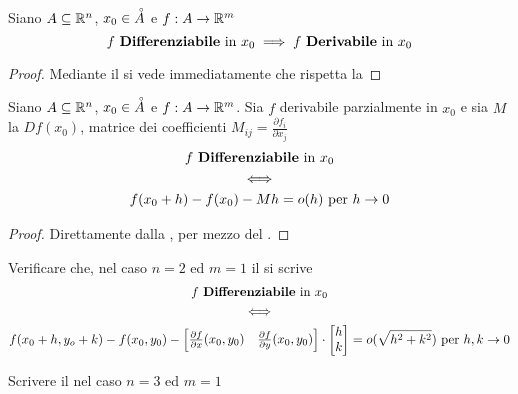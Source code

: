 \begin{corollary}
	Siano $A \subseteq \mathbb{R}^n$, $x_0 \in \accentset{\circ}{A}$ e $f:A \to \mathbb{R}^m$
	\[f \text{ \textbf{Differenziabile} in } x_0 \implies f \text{ \textbf{Derivabile} in } x_0\]
	\begin{proof}
		Mediante il  si vede immediatamente che rispetta la 
	\end{proof}
\end{corollary}
\begin{corollary}
	\label{coro:f_diff_con_matr_comp}
	Siano $A \subseteq \mathbb{R}^n$, $x_0 \in \accentset{\circ}{A}$ e $f:A \to \mathbb{R}^m$. Sia $f$ derivabile parzialmente in $x_0$ e sia $M$ la $Df(x_0)$, matrice dei coefficienti $M_{ij} = \frac{\partial f_i}{\partial x_j}$
	\begin{equation*}
		\begin{gathered}
			f \text{ \textbf{Differenziabile} in } x_0\\
			\iff\\
			f(x_0 + h) - f(x_0) - Mh = o(h) \text{ per } h \to 0
		\end{gathered}
	\end{equation*}
	\begin{proof}
		Direttamente dalla , per mezzo del .
	\end{proof}
\end{corollary}
\begin{exercise}
	Verificare che, nel caso $n = 2$ ed $m = 1$ il  si scrive
	\begin{equation*}
		\begin{gathered}
			f \text{ \textbf{Differenziabile} in } x_0\\
			\iff\\
			f(x_0 + h, y_o + k) - f(x_0, y_0) -
			\begin{bmatrix}
				\frac{\partial f}{\partial x}(x_0, y_0) & \frac{\partial f}{\partial y}(x_0, y_0)
			\end{bmatrix}
			\cdot
			\begin{bmatrix}
				h\\
				k
			\end{bmatrix}
			= o(\sqrt{h^2 + k^2}) \text{ per } h, k \to 0
		\end{gathered}
	\end{equation*}
\end{exercise}
\begin{exercise}
	Scrivere il  nel caso $n = 3$ ed $m = 1$
\end{exercise}

